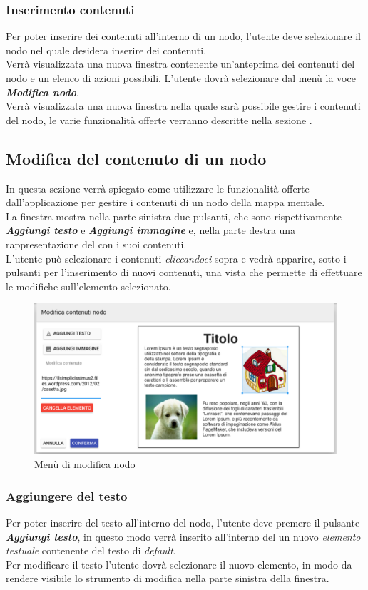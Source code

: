 \subsubsection{Inserimento contenuti}
Per poter inserire dei contenuti all'interno di un nodo, l'utente deve selezionare il nodo nel quale desidera inserire dei contenuti.\\
Verrà visualizzata una nuova finestra contenente un'anteprima dei contenuti del nodo e un elenco di azioni possibili. L'utente dovrà selezionare dal menù la voce \textbf{\textit{Modifica nodo}}.\\
Verrà visualizzata una nuova finestra nella quale sarà possibile gestire i contenuti del nodo, le varie funzionalità offerte verranno descritte nella sezione .
\subsection{Modifica del contenuto di un nodo}\label{editNodo}
In questa sezione verrà spiegato come utilizzare le funzionalità offerte dall'applicazione per gestire i contenuti di un nodo della mappa mentale.\\
La finestra mostra nella parte sinistra due pulsanti, che sono rispettivamente \textbf{\textit{Aggiungi testo}} e \textbf{\textit{Aggiungi immagine}} e, nella parte destra una rappresentazione del  con i suoi contenuti.\\
L'utente può selezionare i contenuti \textit{cliccandoci} sopra e vedrà apparire, sotto i pulsanti per l'inserimento di nuovi contenuti, una vista che permette di effettuare le modifiche sull'elemento selezionato.
\begin{figure}[H]
\centering
\includegraphics[scale=0.38]{immagini/modificaNodo.pdf}
\caption{Menù di modifica nodo \label{modificaNodo}}
\end{figure}
\subsubsection{Aggiungere del testo}
Per poter inserire del testo all'interno del nodo, l'utente deve premere il pulsante \textbf{\textit{Aggiungi testo}}, in questo modo verrà inserito all'interno del  un nuovo \textit{elemento testuale} contenente del testo di \textit{default}.\\
Per modificare il testo l'utente dovrà selezionare il nuovo elemento, in modo da rendere visibile lo strumento di modifica nella parte sinistra della finestra.
